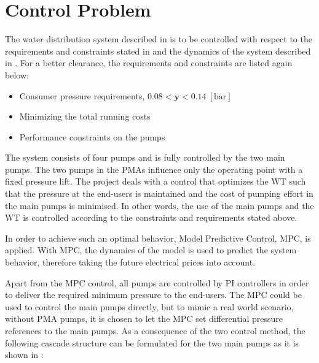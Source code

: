 \section{Control Problem}
\label{control_problem}
The water distribution system described in  is to be controlled with respect to the requirements and constraints stated in  and the dynamics of the system described in . For a better clearance, the requirements and constraints are listed again below: 
\begin{itemize}
	\item Consumer pressure requirements, $0.08 < \bm{y} < 0.14 \:[\text{bar}]$
%
	\item Minimizing the total running costs
%
	\item Performance constraints on the pumps
\end{itemize}
The system consists of four pumps and is fully controlled by the two main pumps. The two pumps in the PMAs influence only the operating point with a fixed pressure lift. The project deals with a control that optimizes the WT such that the pressure at the end-users is maintained and the cost of pumping effort in the main pumps is minimised. In other words, the use of the main pumps and the WT is controlled according to the constraints and requirements stated above. 

In order to achieve such an optimal behavior, Model Predictive Control, MPC, is applied. With MPC, the dynamics of the model is used to predict the system behavior, therefore taking the future electrical prices into account. 

Apart from the MPC control, all pumps are controlled by PI controllers in order to deliver the required minimum pressure to the end-users. The MPC could be used to control the main pumps directly, but to mimic a real world scenario, without PMA pumps, it is chosen to let the MPC set differential pressure references to the main pumps. As a consequence of the two control method, the following cascade structure can be formulated for the two main pumps as it is shown in : 

